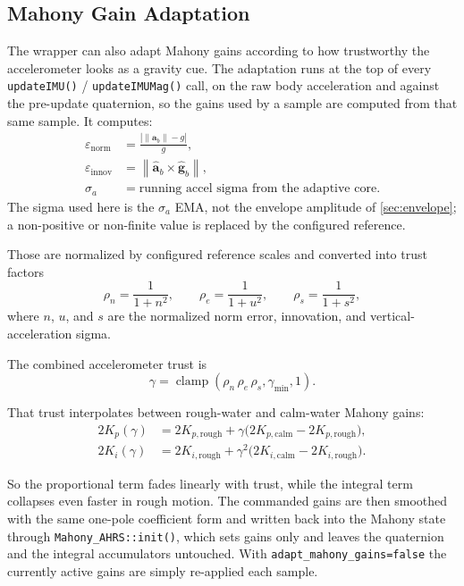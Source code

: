 \documentclass[conference]{IEEEtran}
\DeclareMathOperator{\clamp}{clamp}
\newcommand{\vct}[1]{\bm{#1}}
\begin{document}
    \subsection{Mahony Gain Adaptation}

    The wrapper can also adapt Mahony gains according to how trustworthy the
    accelerometer looks as a gravity cue. The adaptation runs at the top of
    every \texttt{updateIMU()} / \texttt{updateIMUMag()} call, on the raw body
    acceleration and against the pre-update quaternion, so the gains used by a
    sample are computed from that same sample. It computes:
    \begin{align}
        \varepsilon_{\mathrm{norm}} &=
        \frac{\left|\|\vct{a}_b\| - g\right|}{g},\\
        \varepsilon_{\mathrm{innov}} &=
        \left\|\hat{\vct{a}}_b \times \hat{\vct{g}}_b\right\|,\\
        \sigma_a &= \text{running accel sigma from the adaptive core}.
    \end{align}
    The sigma used here is the \(\sigma_a\) EMA, not the envelope amplitude of
    \cref{sec:envelope}; a non-positive or non-finite value is replaced by the
    configured reference.

    Those are normalized by configured reference scales and converted into trust
    factors
    \begin{equation}
        \rho_n = \frac{1}{1+n^2},\qquad
        \rho_e = \frac{1}{1+u^2},\qquad
        \rho_s = \frac{1}{1+s^2},
    \end{equation}
    where \(n\), \(u\), and \(s\) are the normalized norm error, innovation,
    and vertical-acceleration sigma.

    The combined accelerometer trust is
    \begin{equation}
        \gamma = \clamp(\rho_n\,\rho_e\,\rho_s,\gamma_{\min},1).
    \end{equation}

    That trust interpolates between rough-water and calm-water Mahony gains:
    \begin{align}
        2K_p(\gamma)
        &=
        2K_{p,\mathrm{rough}} +
        \gamma\bigl(2K_{p,\mathrm{calm}}-2K_{p,\mathrm{rough}}\bigr),\\
        2K_i(\gamma)
        &=
        2K_{i,\mathrm{rough}} +
        \gamma^2\bigl(2K_{i,\mathrm{calm}}-2K_{i,\mathrm{rough}}\bigr).
    \end{align}

    So the proportional term fades linearly with trust, while the integral term
    collapses even faster in rough motion. The commanded gains are then smoothed
    with the same one-pole coefficient form and written back into the Mahony
    state through \texttt{Mahony\_AHRS::init()}, which sets gains only and leaves
    the quaternion and the integral accumulators untouched. With
    \texttt{adapt\_mahony\_gains=false} the currently active gains are simply
    re-applied each sample.
\end{document}
